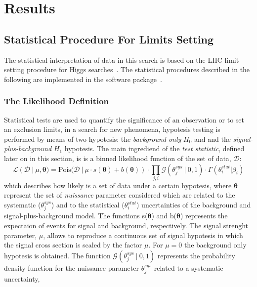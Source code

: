 
\section{Results}
\label{sec:result}

\subsection{Statistical Procedure For Limits Setting}
\label{sec:limits}
The statistical interpretation of data in this search is based on the LHC limit 
setting procedure for Higgs searches~\cite{lhclimits}. The statistical procedures described in the 
following are implemented in the software package~\cite{roofit,roostat,histfactory}.

\subsubsection{The Likelihood Definition}
Statistical tests are used to quantify the significance of an observation or to set an exclusion limits, 
in a search for new phenomena, hypotesis testing is performed by means of two hypotesis: 
the \textit{background only} $H_0$ and and the \textit{signal-plus-background} $H_1$ hypotesis.  
The main ingrediend of the \emph{test statistic}, defined later on in this section, is 
is a binned likelihood function of the set of data, $\mathcal{D}$:
\begin{equation}\label{likelihood}
\mathcal{L}(\mathcal{D}~|~\mu, \boldsymbol{\theta}) = \text{Pois(}\mathcal{D}~ |~ \mu \cdot s(\boldsymbol{\theta}) 
	+ b(\boldsymbol{\theta})) \cdot \prod_{j,i}\mathcal{G}(\theta_j^{sys} ~ | ~ 0, 1) \cdot \Gamma(\theta^{stat}_i | \beta_i)
\end{equation}
which describes how likely is a set of data under a certain hypotesis,
where $\boldsymbol{\theta}$ represent the set of \emph{nuissance} parameter considered which are related to
the systematic ($\theta_j^{sys}$) and to the statistical ($\theta^{stat}_i$) 
uncertainties of the background and signal-plus-background model. 
The functions s($\boldsymbol{\theta}$) and  b($\boldsymbol{\theta}$)
represents the expectaion of events for signal and background, respectively. The signal strenght parameter, $\mu$,
allows to reproduce a continuous set of signal hypotesis in which the signal cross section is scaled by the factor $\mu$.
For $\mu = 0$ the background only hypotesis is obtained. The function $\mathcal{G}(\theta_j^{sys} ~ | ~ 0, 1)$
represents the probability density function for the nuissance parameter $\theta_j^{sys}$ related to a systematic uncertainty, 
